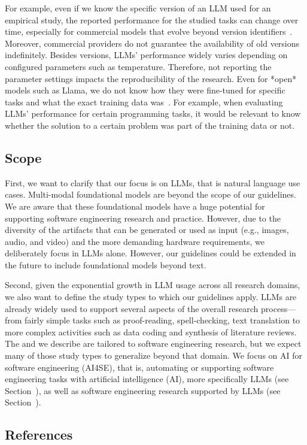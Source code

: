 For example, even if we know the specific version of an LLM used for an empirical study, the reported performance for the studied tasks can change over time, especially for commercial models that evolve beyond version identifiers~\cite{DBLP:journals/corr/abs-2307-09009}.
Moreover, commercial providers do not guarantee the availability of old versions indefinitely.
Besides versions, LLMs' performance widely varies depending on configured parameters such as temperature.
Therefore, not reporting the parameter settings impacts the reproducibility of the research.
Even for *open* models such as Llama, we do not know how they were fine-tuned for specific tasks and what the exact training data was~\cite{Gibney2024}.
For example, when evaluating LLMs' performance for certain programming tasks, it would be relevant to know whether the solution to a certain problem was part of the training data or not.


\subsection{Scope}

First, we want to clarify that our focus is on LLMs, that is natural language use cases.
Multi-modal foundational models are beyond the scope of our guidelines.
We are aware that these foundational models have a huge potential for supporting software engineering research and practice.
However, due to the diversity of  the artifacts that can be generated or used as input (e.g., images, audio, and video) and the more demanding hardware requirements, we deliberately focus in LLMs alone.
However, our guidelines could be extended in the future to include foundational models beyond text.

Second, given the exponential growth in LLM usage across all research domains, we also want to define the study types to which our guidelines apply.
LLMs are already widely used to support several aspects of the overall research process---from fairly simple tasks such as proof-reading, spell-checking, text translation to more complex activities such as data coding and synthesis of literature reviews.
The \studytypes and \guidelines we describe are tailored to software engineering research, but we expect many of those study types to generalize beyond that domain.
We focus on AI for software engineering (AI4SE), that is, automating or supporting software engineering tasks with artificial intelligence (AI), more specifically LLMs (see Section~\llmsforengineers), as well as software engineering research supported by LLMs (see Section~\llmsforresearcher).

\subsection{References}





